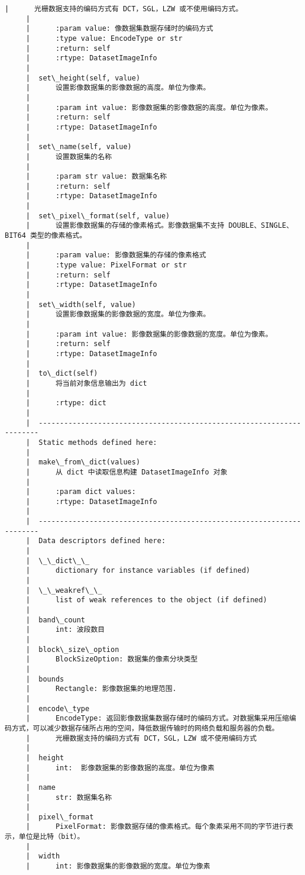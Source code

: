 \documentclass[11pt]{article}
\begin{document}
\begin{Verbatim}[commandchars=\\\{\}]
     |      光栅数据支持的编码方式有 DCT，SGL，LZW 或不使用编码方式。
     |      
     |      :param value: 像数据集数据存储时的编码方式
     |      :type value: EncodeType or str
     |      :return: self
     |      :rtype: DatasetImageInfo
     |  
     |  set\_height(self, value)
     |      设置影像数据集的影像数据的高度。单位为像素。
     |      
     |      :param int value: 影像数据集的影像数据的高度。单位为像素。
     |      :return: self
     |      :rtype: DatasetImageInfo
     |  
     |  set\_name(self, value)
     |      设置数据集的名称
     |      
     |      :param str value: 数据集名称
     |      :return: self
     |      :rtype: DatasetImageInfo
     |  
     |  set\_pixel\_format(self, value)
     |      设置影像数据集的存储的像素格式。影像数据集不支持 DOUBLE、SINGLE、BIT64 类型的像素格式。
     |      
     |      :param value: 影像数据集的存储的像素格式
     |      :type value: PixelFormat or str
     |      :return: self
     |      :rtype: DatasetImageInfo
     |  
     |  set\_width(self, value)
     |      设置影像数据集的影像数据的宽度。单位为像素。
     |      
     |      :param int value: 影像数据集的影像数据的宽度。单位为像素。
     |      :return: self
     |      :rtype: DatasetImageInfo
     |  
     |  to\_dict(self)
     |      将当前对象信息输出为 dict
     |      
     |      :rtype: dict
     |  
     |  ----------------------------------------------------------------------
     |  Static methods defined here:
     |  
     |  make\_from\_dict(values)
     |      从 dict 中读取信息构建 DatasetImageInfo 对象
     |      
     |      :param dict values:
     |      :rtype: DatasetImageInfo
     |  
     |  ----------------------------------------------------------------------
     |  Data descriptors defined here:
     |  
     |  \_\_dict\_\_
     |      dictionary for instance variables (if defined)
     |  
     |  \_\_weakref\_\_
     |      list of weak references to the object (if defined)
     |  
     |  band\_count
     |      int: 波段数目
     |  
     |  block\_size\_option
     |      BlockSizeOption: 数据集的像素分块类型
     |  
     |  bounds
     |      Rectangle: 影像数据集的地理范围.
     |  
     |  encode\_type
     |      EncodeType: 返回影像数据集数据存储时的编码方式。对数据集采用压缩编码方式，可以减少数据存储所占用的空间，降低数据传输时的网络负载和服务器的负载。
     |      光栅数据支持的编码方式有 DCT，SGL，LZW 或不使用编码方式
     |  
     |  height
     |      int:  影像数据集的影像数据的高度。单位为像素
     |  
     |  name
     |      str: 数据集名称
     |  
     |  pixel\_format
     |      PixelFormat: 影像数据存储的像素格式。每个象素采用不同的字节进行表示，单位是比特（bit）。
     |  
     |  width
     |      int: 影像数据集的影像数据的宽度。单位为像素
    

\end{Verbatim}
\end{document}
